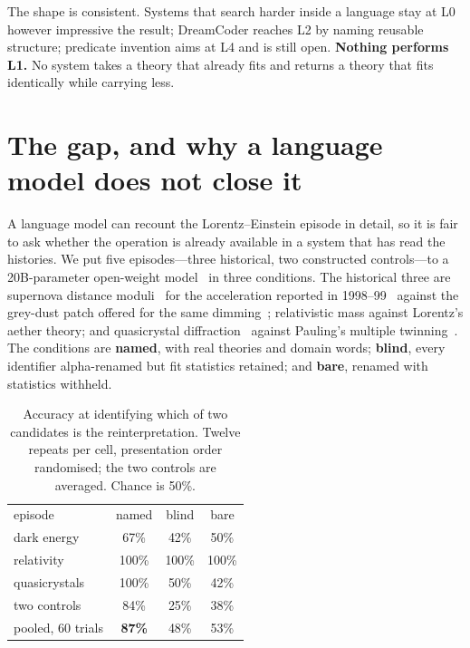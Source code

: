 \documentclass[aps,pra,twocolumn,superscriptaddress,nofootinbib,10pt]{revtex4-2}
\begin{document}
The shape is consistent. Systems that search harder inside a language stay at L0 however
impressive the result; DreamCoder reaches L2 by naming reusable structure; predicate invention
aims at L4 and is still open. \textbf{Nothing performs L1.} No system takes a theory that already
fits and returns a theory that fits identically while carrying less.

\section{The gap, and why a language model does not close it}
\label{sec:llm}

A language model can recount the Lorentz--Einstein episode in detail, so it is fair to ask
whether the operation is already available in a system that has read the histories. We put five
episodes---three historical, two constructed controls---to a 20B-parameter open-weight
model~\cite{openai2025gptoss} in three conditions. The historical three are supernova distance
moduli~\cite{scolnic2018pantheon} for the acceleration reported in
1998--99~\cite{riess1998acceleration,perlmutter1999measurements} against the grey-dust patch
offered for the same dimming~\cite{aguirre1999dust}; relativistic mass against Lorentz's aether
theory; and quasicrystal diffraction~\cite{shechtman1984quasicrystal} against Pauling's multiple
twinning~\cite{pauling1985twinning}. The conditions are \textbf{named}, with real theories and
domain words; \textbf{blind}, every identifier alpha-renamed but fit statistics retained; and
\textbf{bare}, renamed with statistics withheld.

\begin{table}[b]
\centering
\caption{Accuracy at identifying which of two candidates is the reinterpretation. Twelve repeats
per cell, presentation order randomised; the two controls are averaged. Chance is 50\%.}
\label{tab:llm}
\begin{ruledtabular}
\begin{tabular}{lccc}
episode & named & blind & bare \\
\colrule
dark energy & 67\% & 42\% & 50\% \\
relativity & 100\% & 100\% & 100\% \\
quasicrystals & 100\% & 50\% & 42\% \\
two controls & 84\% & 25\% & 38\% \\
\colrule
pooled, 60 trials & \textbf{87\%} & 48\% & 53\% \\
\end{tabular}
\end{ruledtabular}
\end{table}
\end{document}
